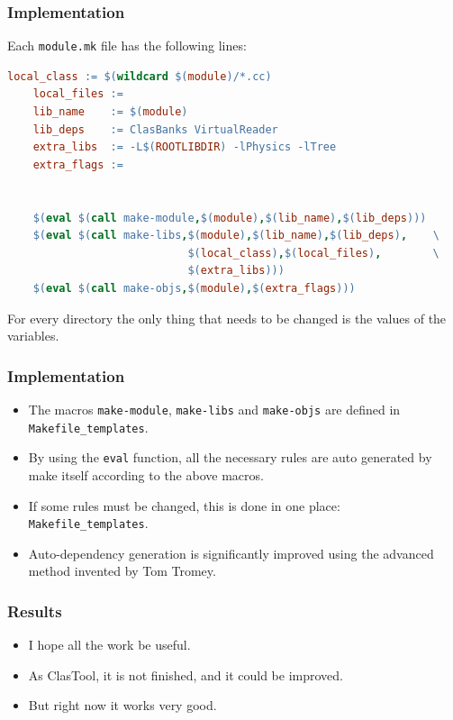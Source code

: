 \documentclass[11pt]{beamer}
\begin{document}

\begin{frame}[fragile]
  \frametitle{Implementation}
  Each \texttt{module.mk} file has the following lines:

  \begin{lstlisting}[language=make]
    local_class := $(wildcard $(module)/*.cc)
    local_files :=
    lib_name    := $(module)
    lib_deps    := ClasBanks VirtualReader
    extra_libs  := -L$(ROOTLIBDIR) -lPhysics -lTree
    extra_flags := 


    $(eval $(call make-module,$(module),$(lib_name),$(lib_deps)))
    $(eval $(call make-libs,$(module),$(lib_name),$(lib_deps),    \
                            $(local_class),$(local_files),        \
                            $(extra_libs)))
    $(eval $(call make-objs,$(module),$(extra_flags)))
  \end{lstlisting}

  For every directory the only thing that needs to be changed is the values of
  the variables.
\end{frame}


\begin{frame}
  \frametitle{Implementation}
  \begin{itemize}
    \item The macros \texttt{make-module}, \texttt{make-libs} and
      \texttt{make-objs} are defined in \texttt{Makefile\_templates}.\\[4mm]
    \item By using the \texttt{eval} function, all the necessary rules are
      auto generated by make itself according to the above macros.\\[4mm]
    \item If some rules must be changed, this is done in one place:
      \texttt{Makefile\_templates}.\\[4mm]
    \item Auto-dependency generation is significantly improved using the
      advanced method invented by Tom Tromey.
  \end{itemize}
\end{frame}


\begin{frame}
  \frametitle{Results}
  \begin{itemize}
    \item I hope all the work be useful.\\[5mm]
    \item As ClasTool, it is not finished, and it could be improved.\\[8mm]
    \item<2> But right now it works very good.
  \end{itemize}
\end{frame}
\end{document}
